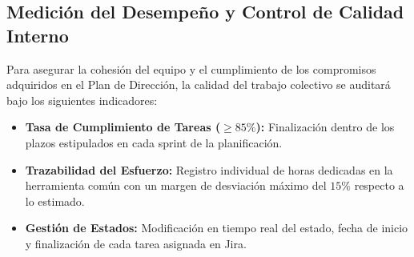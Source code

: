 \subsection{Medición del Desempeño y Control de Calidad Interno}
Para asegurar la cohesión del equipo y el cumplimiento de los compromisos adquiridos en el Plan de Dirección, la calidad del trabajo colectivo se auditará bajo los siguientes indicadores:
\begin{itemize}
    \item \textbf{Tasa de Cumplimiento de Tareas ($\ge 85\%$):} Finalización dentro de los plazos estipulados en cada sprint de la planificación.
    \item \textbf{Trazabilidad del Esfuerzo:} Registro individual de horas dedicadas en la herramienta común con un margen de desviación máximo del $15\%$ respecto a lo estimado.
    \item \textbf{Gestión de Estados:} Modificación en tiempo real del estado, fecha de inicio y finalización de cada tarea asignada en Jira.
\end{itemize}



